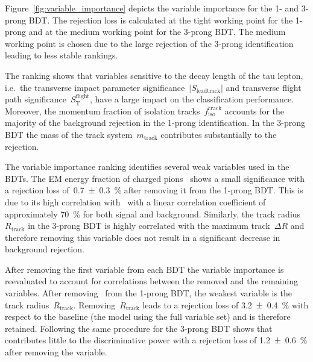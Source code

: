 Figure~\ref{fig:variable_importance} depicts the variable importance for the 1-
and 3-prong BDT. The rejection loss is calculated at the tight working point for
the 1-prong and at the medium working point for the 3-prong BDT. The medium
working point is chosen due to the large rejection of the 3-prong identification
leading to less stable rankings.

The ranking shows that variables sensitive to the decay length of the tau
lepton, i.e.\ the transverse impact parameter
significance~$|S_\text{leadtrack}|$ and transverse flight path
significance~$S_\text{T}^\text{flight}$, have a large impact on the
classification performance. Moreover, the momentum fraction of isolation
tracks~$f_\text{iso}^\text{track}$ accounts for the majority of the background
rejection in the 1-prong identification. In the 3-prong BDT the mass of the
track system~$m_\text{track}$ contributes substantially to the rejection.

The variable importance ranking identifies several weak variables used in the
BDTs. The EM energy fraction of charged
pions~ shows a small significance with a
rejection loss of~\SI{0.7 +- 0.3}{\percent} after removing it from the 1-prong
BDT. This is due to its high correlation
with~ with a linear correlation
coefficient of approximately \SI{70}{\percent} for both signal and background.
Similarly, the track radius~$R_\text{track}$ in the 3-prong BDT is highly
correlated with the maximum track~$\Delta R$ and therefore removing this
variable does not result in a significant decrease in background rejection.

After removing the first variable from each BDT the variable importance is
reevaluated to account for correlations between the removed and the remaining
variables. After removing~ from the
1-prong BDT, the weakest variable is the track radius~$R_\text{track}$.
Removing~$R_\text{track}$ leads to a rejection loss of \SI{3.2 +- 0.4}{\percent}
with respect to the baseline (the model using the full variable set) and is
therefore retained. Following the same procedure for the 3-prong BDT shows
that~ contributes little to the
discriminative power with a rejection loss of \SI{1.2 +- 0.6}{\percent} after
removing the variable.

